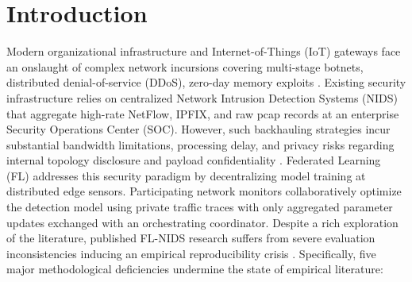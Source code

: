 \documentclass[runningheads]{llncs}
\begin{document}
\section{Introduction}
Modern organizational infrastructure and Internet-of-Things (IoT) gateways face an onslaught of complex network incursions covering multi-stage botnets, distributed denial-of-service (DDoS), zero-day memory exploits \cite{alsaedi2020ton,garcia2020iot23}. Existing security infrastructure relies on centralized Network Intrusion Detection Systems (NIDS) that aggregate high-rate NetFlow, IPFIX, and raw pcap records at an enterprise Security Operations Center (SOC). However, such backhauling strategies incur substantial bandwidth limitations, processing delay, and privacy risks regarding internal topology disclosure and payload confidentiality \cite{campos2022evaluating,mothukuri2021federated}. Federated Learning (FL) \cite{mcmahan2017communication,kairouz2021advances} addresses this security paradigm by decentralizing model training at distributed edge sensors. Participating network monitors collaboratively optimize the detection model using private traffic traces with only aggregated parameter updates exchanged with an orchestrating coordinator. Despite a rich exploration of the literature, published FL-NIDS research suffers from severe evaluation inconsistencies inducing an empirical reproducibility crisis \cite{campos2022evaluating,popoola2021federated}. Specifically, five major methodological deficiencies undermine the state of empirical literature:
\end{document}
